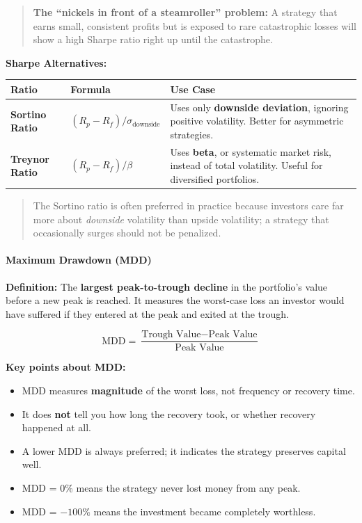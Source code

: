 \documentclass[12pt,openany]{book}
\begin{document}
\begin{quote}
    \textbf{The ``nickels in front of a steamroller'' problem:} A strategy that earns small, consistent profits but is exposed to rare catastrophic losses will show a high Sharpe ratio right up until the catastrophe.
\end{quote}

\textbf{Sharpe Alternatives:}

\begin{center}
\begin{tabular}{|L{0.18\textwidth}|L{0.28\textwidth}|L{0.44\textwidth}|}
\hline
\textbf{Ratio} & \textbf{Formula} & \textbf{Use Case} \\
\hline
\textbf{Sortino Ratio} & $(R_p - R_f) / \sigma_{\text{downside}}$ & Uses only \textbf{downside deviation}, ignoring positive volatility. Better for asymmetric strategies. \\
\hline
\textbf{Treynor Ratio} & $(R_p - R_f) / \beta$ & Uses \textbf{beta}, or systematic market risk, instead of total volatility. Useful for diversified portfolios. \\
\hline
\end{tabular}
\end{center}

\begin{quote}
    The Sortino ratio is often preferred in practice because investors care far more about \emph{downside} volatility than upside volatility; a strategy that occasionally surges should not be penalized.
\end{quote}

\paragraph{Maximum Drawdown (MDD)}

\textbf{Definition:} The \textbf{largest peak-to-trough decline} in the portfolio's value before a new peak is reached. It measures the worst-case loss an investor would have suffered if they entered at the peak and exited at the trough.

\begin{equation*}
    \text{MDD} = \frac{\text{Trough Value} - \text{Peak Value}}{\text{Peak Value}}
\end{equation*}

\textbf{Key points about MDD:}
\begin{itemize}[leftmargin=*]
    \item MDD measures \textbf{magnitude} of the worst loss, not frequency or recovery time.
    \item It does \textbf{not} tell you how long the recovery took, or whether recovery happened at all.
    \item A lower MDD is always preferred; it indicates the strategy preserves capital well.
    \item MDD = 0\% means the strategy never lost money from any peak.
    \item MDD = $-100\%$ means the investment became completely worthless.
\end{itemize}
\end{document}
